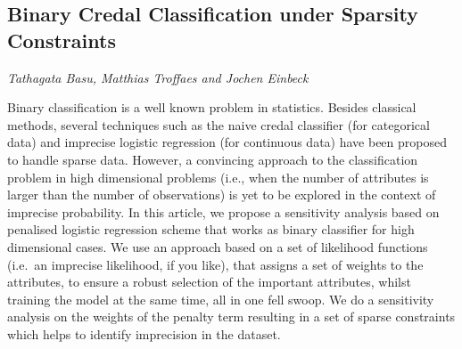 \documentclass[../booklet.tex]{subfiles}
\begin{document}
\subsection[Binary Credal Classification under Sparsity Constraints. {\it Tathagata Basu, Matthias Troffaes and Jochen Einbeck}]{Binary Credal Classification under Sparsity Constraints}
  

\begin{center}
  {\it Tathagata Basu, Matthias Troffaes and Jochen Einbeck}
\end{center}

\vskip 0.8cm


Binary classification is a well known problem in statistics. 
Besides classical methods, several techniques such as
the naive credal classifier (for categorical data) and imprecise logistic 
regression (for continuous data) have been proposed
to handle sparse data.
However, a convincing approach to the
classification problem in high dimensional problems (i.e., when the 
number of attributes is larger than the number of observations) is yet to
be explored in the context of imprecise probability. In this
article, we propose a sensitivity analysis based on penalised logistic regression
scheme that works as binary classifier for high dimensional cases.
We use an approach based on a set of likelihood functions (i.e.~an imprecise likelihood, 
if you like),  that assigns a set of weights to the attributes,
to ensure a robust selection of the important attributes,
whilst training the model at the same time, all in one fell swoop.
We do a sensitivity analysis on the weights of the penalty term resulting
in a set of sparse constraints which helps to identify imprecision in the dataset.

\end{document}
